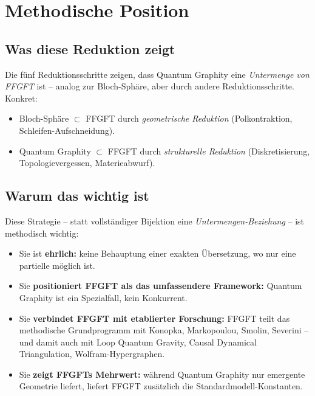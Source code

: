 \section{Methodische Position}

\subsection{Was diese Reduktion zeigt}

Die fünf Reduktionsschritte zeigen, dass Quantum Graphity eine
\emph{Untermenge von FFGFT} ist -- analog zur Bloch-Sphäre, aber
durch andere Reduktionsschritte. Konkret:
\begin{itemize}[leftmargin=2em,itemsep=2pt,topsep=2pt]
  \item Bloch-Sphäre $\subset$ FFGFT durch \emph{geometrische
        Reduktion} (Polkontraktion, Schleifen-Aufschneidung).
  \item Quantum Graphity $\subset$ FFGFT durch \emph{strukturelle
        Reduktion} (Diskretisierung, Topologievergessen,
        Materieabwurf).
\end{itemize}

\subsection{Warum das wichtig ist}

Diese Strategie -- statt vollständiger Bijektion eine
\emph{Untermengen-Beziehung} -- ist methodisch wichtig:

\begin{itemize}[leftmargin=2em,itemsep=2pt,topsep=2pt]
  \item Sie ist \textbf{ehrlich:} keine Behauptung einer exakten
        Übersetzung, wo nur eine partielle möglich ist.
  \item Sie \textbf{positioniert FFGFT als das umfassendere
        Framework:} Quantum Graphity ist ein Spezialfall, kein
        Konkurrent.
  \item Sie \textbf{verbindet FFGFT mit etablierter Forschung:}
        FFGFT teilt das methodische Grundprogramm mit Konopka,
        Markopoulou, Smolin, Severini -- und damit auch mit Loop
        Quantum Gravity, Causal Dynamical Triangulation,
        Wolfram-Hypergraphen.
  \item Sie \textbf{zeigt FFGFTs Mehrwert:} während Quantum Graphity
        nur emergente Geometrie liefert, liefert FFGFT zusätzlich
        die Standardmodell-Konstanten.
\end{itemize}

